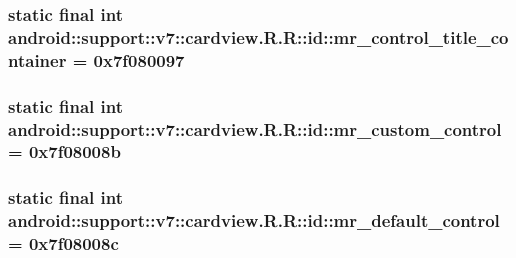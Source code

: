 \hypertarget{classandroid_1_1support_1_1v7_1_1cardview_1_1_r_1_1id_f85439769d176de9b80afab7bfa3649e}{
\subsubsection[{mr\_\-control\_\-title\_\-container}]{\setlength{\rightskip}{0pt plus 5cm}static final int android::support::v7::cardview.R.R::id::mr\_\-control\_\-title\_\-container = 0x7f080097}}
\label{classandroid_1_1support_1_1v7_1_1cardview_1_1_r_1_1id_f85439769d176de9b80afab7bfa3649e}


\hypertarget{classandroid_1_1support_1_1v7_1_1cardview_1_1_r_1_1id_9df7d8269a21f4bd871c5bb96188aaf8}{
\subsubsection[{mr\_\-custom\_\-control}]{\setlength{\rightskip}{0pt plus 5cm}static final int android::support::v7::cardview.R.R::id::mr\_\-custom\_\-control = 0x7f08008b}}
\label{classandroid_1_1support_1_1v7_1_1cardview_1_1_r_1_1id_9df7d8269a21f4bd871c5bb96188aaf8}


\hypertarget{classandroid_1_1support_1_1v7_1_1cardview_1_1_r_1_1id_f50e9aad64f6978d053e389b84dfcb02}{
\subsubsection[{mr\_\-default\_\-control}]{\setlength{\rightskip}{0pt plus 5cm}static final int android::support::v7::cardview.R.R::id::mr\_\-default\_\-control = 0x7f08008c}}
\label{classandroid_1_1support_1_1v7_1_1cardview_1_1_r_1_1id_f50e9aad64f6978d053e389b84dfcb02}


